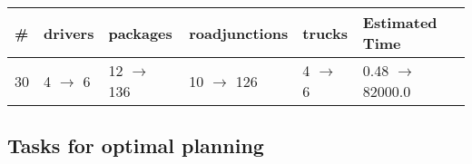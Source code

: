 \documentclass{article}
\begin{document}
                        \begin{center}
                        \begin{tabular}{@{}l|l|l|l|l|l@{}}
                        \# & drivers & packages & roadjunctions & trucks & Estimated Time\\\midrule
                        30&4 $\rightarrow$ 6&12 $\rightarrow$ 136&10 $\rightarrow$ 126&4 $\rightarrow$ 6&0.48 $\rightarrow$ 82000.0
                        \end{tabular}
                        \end{center}
                    
                                \subsection*{Tasks for optimal planning}
                                
\end{document}
